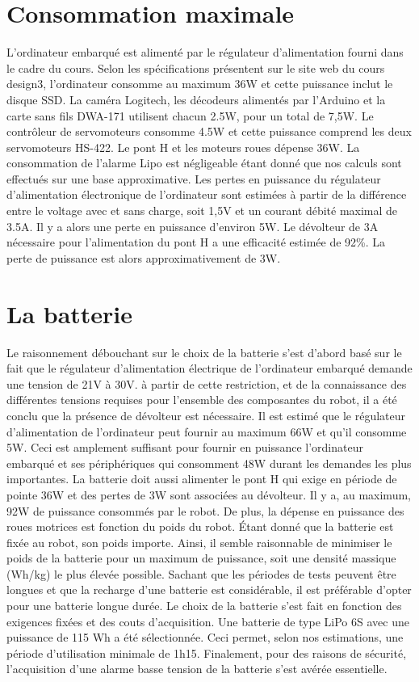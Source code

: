 \section{Consommation maximale}
L'ordinateur embarqué est alimenté par le régulateur d'alimentation fourni dans le cadre du cours. Selon les spécifications présentent sur le site web du cours design3,
l'ordinateur consomme au maximum 36W et cette puissance inclut le disque SSD. La caméra Logitech, les décodeurs alimentés par l'Arduino et la carte sans fils DWA-171 utilisent chacun 2.5W,
pour un total de 7,5W. Le contrôleur de servomoteurs consomme 4.5W et cette puissance comprend les deux servomoteurs HS-422. Le pont H et les moteurs roues dépense 36W. La consommation de l'alarme
Lipo est négligeable étant donné que nos calculs sont effectués sur une base approximative. Les pertes en puissance du régulateur d'alimentation électronique de l'ordinateur sont estimées à partir
de la différence entre le voltage avec et sans charge, soit 1,5V et un courant débité maximal de 3.5A. Il y a alors une perte en puissance d'environ 5W. Le dévolteur de 3A nécessaire pour
l'alimentation du pont H a une efficacité estimée de 92\%. La perte de puissance est alors approximativement de 3W.

\section{La batterie}
Le raisonnement débouchant sur le choix de la batterie s'est d'abord basé sur le fait que le régulateur d'alimentation électrique de l'ordinateur embarqué demande une tension de 21V à 30V.
à partir de cette restriction, et de la connaissance des différentes tensions  requises pour l'ensemble des composantes du robot, il a été conclu que la présence de dévolteur est nécessaire.
Il est estimé que le régulateur d'alimentation de l'ordinateur peut fournir au maximum 66W et qu'il consomme 5W. Ceci est amplement suffisant pour fournir en puissance l'ordinateur embarqué et ses
périphériques qui consomment 48W durant les demandes les plus importantes. La batterie doit aussi alimenter le pont H qui exige en période de pointe 36W et des pertes de 3W sont associées au dévolteur.
Il y a, au maximum, 92W de puissance consommés par le robot. De plus, la dépense en puissance des roues motrices est fonction du poids du robot. Étant donné que la batterie est fixée au robot, son poids
importe. Ainsi, il semble raisonnable de  minimiser le poids de la batterie pour un maximum de puissance, soit une densité massique (Wh/kg) le plus élevée possible. Sachant que les périodes de tests peuvent
 être longues et que la recharge d'une batterie est considérable, il est préférable d'opter pour une batterie longue durée. Le choix de la batterie s'est fait en fonction des exigences fixées et des couts
 d'acquisition. Une batterie de type LiPo 6S avec une puissance de 115 Wh a été sélectionnée. Ceci permet, selon nos estimations, une période d'utilisation minimale de 1h15. Finalement, pour des raisons de
 sécurité, l'acquisition d'une alarme basse tension de la batterie s'est avérée essentielle.


